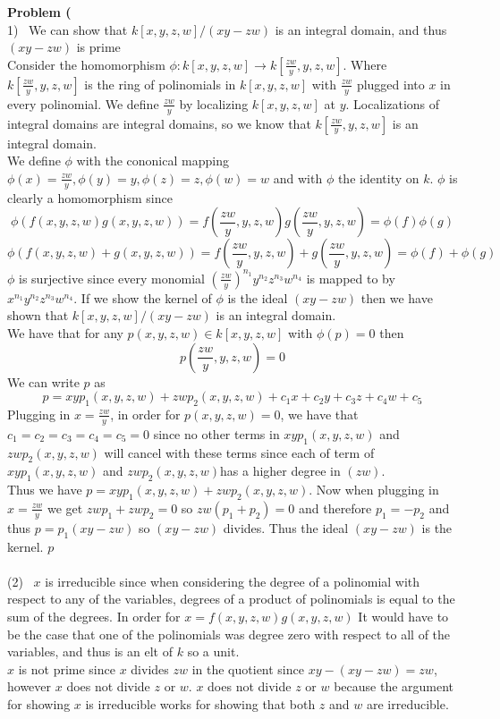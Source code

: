 \documentclass[12pt]{article}
\newenvironment{ques}[1]{\textbf{Problem #1}\vspace{1 mm}\\ }{\bigskip}
\theoremstyle{definition}
\renewcommand{\l}{\left }
\renewcommand{\r}{\right }
\begin{document}
\begin{ques}{1.6}
	(1) \ We can show that $k[x,y,z,w]/(xy - zw)$ is an integral domain, and
	thus $(xy-zw)$ is prime\\
	Consider the homomorphism $\phi :k[x,y,z,w] \to k[\frac{zw}{y}, y, z, w]$.
	Where $k[\frac{zw}{y}, y, z, w]$ is the ring of polinomials in $k[x,y,z,w]$
	with $\frac{zw}{y}$ plugged into $x$ in every polinomial. We define
	$\frac{zw}{y}$ by localizing $k[x,y,z,w]$ at $y$. Localizations of integral
	domains are integral domains, so we know that $k[\frac{zw}{y}, y, z, w]$ is
	an integral domain.\\
	We define $\phi$ with the cononical mapping $\phi(x) = \frac{zw}{y},
	\phi(y) = y, \phi(z) = z, \phi(w) = w$ and with $\phi$ the identity on $k$.
	$\phi$ is clearly a homomorphism since
	$$\phi(f(x,y,z,w)g(x,y,z,w)) = f(\frac{zw}{y}, y, z, w)g(\frac{zw}{y}, y,
	z, w) = \phi(f)\phi(g)$$ 
	$$\phi(f(x,y,z,w) + g(x,y,z,w)) = f(\frac{zw}{y}, y, z, w) +
	g(\frac{zw}{y}, y, z, w) = \phi(f) + \phi(g)$$ 
	$\phi$ is surjective since every monomial $\l(\frac{zw}{y}\r)^{n_1} y^{n_2}
	z^{n_3} w^{n_4}$ is mapped to by $x^{n_1} y^{n_2} z^{n_3} w^{n_4}$. If we
	show the kernel of $\phi$ is the ideal $(xy-zw)$ then we have shown that
	$k[x,y,z,w]/(xy -zw)$ is an integral domain.\\
	We have that for any $p(x,y,z,w) \in k[x,y,z,w]$ with $\phi(p) = 0$ then
	$$p(\frac{zw}{y},y,z,w) = 0$$
	We can write $p$ as 
	$$p = xyp_1(x,y,z,w) + zwp_2(x,y,z,w) + c_1x + c_2y + c_3z + c_4w + c_5$$
	Plugging in $x = \frac{zw}{y}$, in order for $p(x,y,z,w) = 0$, we have that
	$c_1 = c_2 = c_3 = c_4 = c_5 = 0$ since no other terms in $xyp_1(x,y,z,w)$
	and $zwp_2(x,y,z,w)$ will cancel with these terms since each of term of
	$xyp_1(x,y,z,w)$
		and $zwp_2(x,y,z,w)$has a higher
	degree in $(zw)$.\\
	Thus we have $p = xyp_1(x,y,z,w) + zwp_2(x,y,z,w)$.
	Now when plugging in $x = \frac{zw}{y}$ we get $zwp_1 + zwp_2 = 0$ so
	$zw(p_1 + p_2) = 0$ and therefore $p_1 = -p_2$ and thus $p = p_1(xy - zw)$
	so $(xy- zw)$ divides. Thus the ideal $(xy-zw)$ is the kernel.
	$p$\\
\\
	(2) \ $x$ is irreducible since when considering the degree
	of a polinomial with respect to any of the variables, degrees of a product
	of polinomials is equal to the sum of the degrees. In order for $x =
	f(x,y,z,w)g(x,y,z,w)$ It would have to be the case that one of the
	polinomials was degree zero with respect to all of the variables, and thus
	is an elt of $k$ so a unit.\\
	$x$ is not prime since $x$ divides $zw$ in the quotient since $xy - (xy -
	zw) = zw$, however $x$ does not divide $z$ or $w$. $x$ does not divide $z$
	or $w$  because the argument for showing $x$ is irreducible works for
	showing that both $z$ and $w$ are irreducible.

\end{ques}
\end{document}
